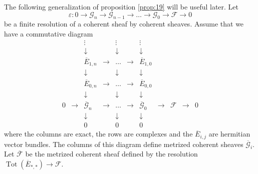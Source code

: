 \documentclass[10pt,twoside]{article}
\numberwithin{equation}{section}
\theoremstyle{plain}
\theoremstyle{definition}
\DeclareMathOperator{\Tot}{Tot}
\begin{document}
The following generalization of proposition \ref{prop:19} will be
useful later. 
Let
\begin{displaymath}
 \varepsilon \colon 0\rightarrow \mathcal{G}_{n}\rightarrow
 \mathcal{G}_{n-1}\rightarrow 
\dots \rightarrow
  \mathcal{G}_{0} \rightarrow \mathcal{F}\rightarrow 0
\end{displaymath}
be a finite resolution of a coherent sheaf by coherent sheaves. Assume
that we have a commutative diagram
  $$\begin{array}{ccccccccccc}
    && \vdots && \vdots && \vdots && &&\\
    && \downarrow && \downarrow && \downarrow && &&\\
    && \overline{E}_{1,n} & \rightarrow &
    \ldots & \rightarrow &
    \overline{E}_{1,0} && &&\\
    && \downarrow && \downarrow && \downarrow && &&\\
    && \overline{E}_{0,n} & \rightarrow &
    \ldots & \rightarrow &
    \overline{E}_{0,0} && &&\\
    && \downarrow && \downarrow && \downarrow && &&\\
    0 & \rightarrow & \overline{\mathcal{G}}_{n} & \rightarrow &
    \ldots & \rightarrow &
    \overline{\mathcal{G}}_{0} & \rightarrow & \mathcal{F}
    &\rightarrow & 0 \\
    && \downarrow && \downarrow && \downarrow &&&& \\
    && 0 && 0 && 0 &&
  \end{array}$$
where the columns are exact, the rows are complexes and the $\overline
E_{i,j}$ are hermitian 
vector bundles. The columns of this diagram define
metrized coherent sheaves $\overline{\mathcal{G}}_{i}$. Let $\overline
{\mathcal{F}}$ be the metrized coherent sheaf defined by the
resolution $\Tot(\overline E_{\ast,\ast})\longrightarrow
\mathcal{F}$. 
\end{document}

